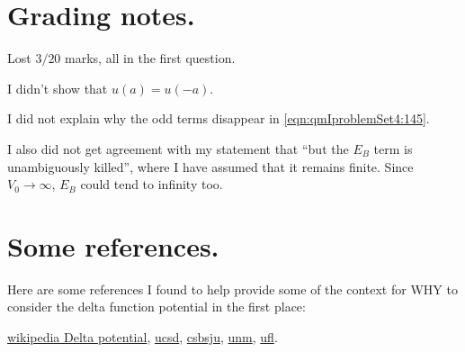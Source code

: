 \section{Grading notes.}

Lost $3/20$ marks, all in the first question.  

I didn't show that $u(a) = u(-a)$.

I did not explain why the odd terms disappear in \ref{eqn:qmIproblemSet4:145}.  

I also did not get agreement with my statement that ``but the $E_B$ term is unambiguously killed'', where I have assumed that it remains finite.  Since $V_0 \rightarrow \infty$, $E_B$ could tend to infinity too.

\section{Some references.}

Here are some references I found to help provide some of the context for WHY to consider the delta function potential in the first place:

\href{http://en.wikipedia.org/wiki/Delta_potential}{wikipedia Delta potential},
\href{http://quantummechanics.ucsd.edu/ph130a/130_notes/node156.html}{ucsd},
\href{http://www.physics.csbsju.edu/QM/delta.01.html}{csbsju},
\href{http://panda.unm.edu/Courses/Fields/Phys491/Notes/TISEDelta.pdf}{unm},
\href{http://www.phys.ufl.edu/~rfield/PHY4604/images/Chapter2_20.pdf}{ufl}.

\EndArticle
